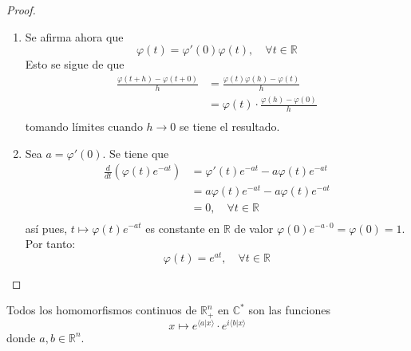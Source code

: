 \documentclass[12pt]{report}
\theoremstyle{largebreak}
\newcommand\pint[2]{\ensuremath{\langle#1| #2\rangle}}
\begin{document}
\begin{proof}
\begin{enumerate}
            \item Se afirma ahora que
            \begin{equation*}
                \varphi(t)=\varphi'(0)\varphi(t),\quad\forall t\in\mathbb{R}
            \end{equation*}
            Esto se sigue de que
            \begin{equation*}
                \begin{split}
                    \frac{\varphi(t+h)-\varphi(t+0)}{h}&=\frac{\varphi(t)\varphi(h)-\varphi(t)}{h}\\
                    &=\varphi(t)\cdot\frac{\varphi(h)-\varphi(0)}{h}\\
                \end{split}
            \end{equation*}
            tomando límites cuando $h\rightarrow0$ se tiene el resultado.
            \item Sea $a=\varphi'(0)$. Se tiene que
            \begin{equation*}
                \begin{split}
                    \frac{d}{dt}\left(\varphi(t)e^{-at} \right)&=\varphi'(t)e^{-at}-a\varphi(t)e^{-at}\\
                    &=a\varphi(t)e^{-at}-a\varphi(t)e^{-at}\\
                    &=0,\quad\forall t\in\mathbb{R}\\
                \end{split}
            \end{equation*}
            así pues, $t\mapsto\varphi(t)e^{-at}$ es constante en $\mathbb{R}$ de valor $\varphi(0)e^{-a\cdot0}=\varphi(0)=1$. Por tanto:
            \begin{equation*}
                \varphi(t)=e^{at},\quad\forall t\in\mathbb{R}
            \end{equation*}
        \end{enumerate}
    \end{proof}

    \begin{theor}
        Todos los homomorfismos continuos de $\mathbb{R}_+^n$ en $\mathbb{C}^*$ son las funciones
        \begin{equation*}
            x\mapsto e^{\pint{a}{x}}\cdot e^{i\pint{b}{x}}
        \end{equation*}
        donde $a,b\in\mathbb{R}^n$.
    \end{theor}
\end{document}
